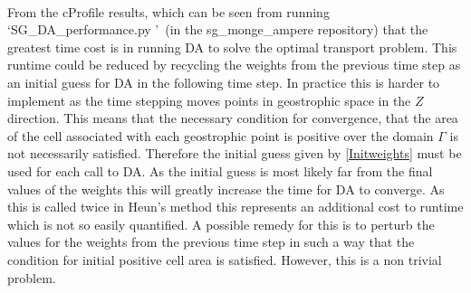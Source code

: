 \\
\linebreak
From the cProfile results, which can be seen from running \textquoteleft SG\_DA\_performance.py \textquoteright \ (in the sg\_monge\_ampere repository) that the greatest time cost is in running DA to solve the optimal transport problem. This runtime could be reduced by recycling the weights from the previous time step as an initial guess for DA in the following time step. In practice this is harder to implement as the time stepping moves points in geostrophic space in the $Z$ direction. This means that the necessary condition for convergence, that the area of the cell associated with each geostrophic point is positive over the domain $\Gamma$ is not necessarily satisfied. Therefore the initial guess given by \ref{Initweights}  must be used for each call to DA. As the initial guess is most likely far from the final values of the weights this will greatly increase the time for DA to converge. As this is called twice in Heun's method this represents an additional cost to runtime which is not so easily quantified. A possible remedy for this is to perturb the values for the weights from the previous time step in such a way that the condition for initial positive cell area is satisfied. However, this is a non trivial problem.